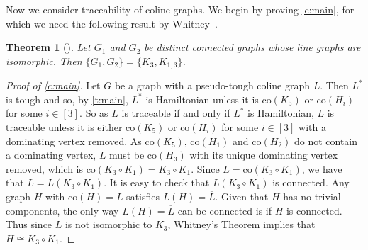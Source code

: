 \documentclass[12pt]{article}
\newtheorem{thm}{Theorem}[section]
\theoremstyle{definition}
\newcommand{\co}{\text{co}}
\begin{document}
Now we consider traceability of coline graphs. 
We begin by proving \cref{c:main}, for which we need the following result by Whitney~\cite{Wh32}. 
\begin{thm}[\cite{Wh32}]\label{t:Whit}
Let $G_1$ and $G_2$ be distinct connected graphs whose line graphs are isomorphic. Then 
$\{G_1,G_2\} = \{K_3,K_{1,3}\}$.
\end{thm}
\begin{proof}[Proof of \cref{c:main}]
Let $G$ be a graph with a pseudo-tough coline graph $L$. Then $L^*$ is tough and so, by \cref{t:main}, $L^*$ is Hamiltonian unless it is $\co(K_5)$ or $\co(H_i)$ for some $i\in [3]$.
So as $L$ is traceable if and only if $L^*$ is Hamiltonian, $L$ is traceable unless it is either $\co(K_5)$ or $\co(H_i)$ for some $i\in [3]$ with a dominating vertex removed. As $\co(K_5)$, $\co(H_1)$ and $\co(H_2)$ do not contain a dominating vertex, $L$ must be $\co(H_3)$ with its unique dominating vertex removed, which is $\co(K_3 \circ K_1)=K_3 \circ K_1$. 
Since $L=\co(K_3 \circ K_1)$, we have that $\overline{L} = L(K_3 \circ K_1)$. It is easy to check that $L(K_3 \circ K_1)$ is connected. Any graph $H$ with $\co(H)=L$ satisfies $L(H)=\overline{L}$. Given that $H$ has no trivial components, the only way $L(H)=\overline{L}$ can be connected is if $H$ is connected. Thus since $\overline{L}$ is not isomorphic to $K_3$, 
Whitney's Theorem implies that $H \cong K_3 \circ K_1$.
\end{proof}
\end{document}
